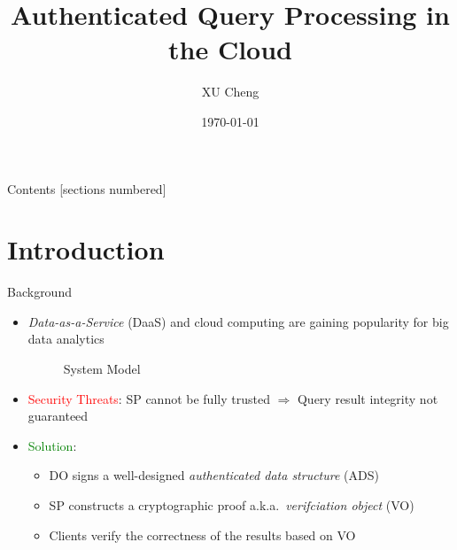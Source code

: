 \documentclass[xcolor={dvipsnames},aspectratio=169,10pt]{beamer}
\title{Authenticated Query Processing in the Cloud}
\author{XU Cheng}
\institute{Supervisor: Prof.~XU Jianliang}
\date{\today}
\begin{document}
\maketitle%

\begin{frame}{Contents}
  [sections numbered]
  \tableofcontents[hideallsubsections]
\end{frame}

\section{Introduction}

\begin{frame}{Background}
  \begin{itemize}[<+->]
    \item \alert{\emph{Data-as-a-Service} (DaaS)} and \alert{cloud computing} are gaining popularity for big data analytics
      \begin{figure}
        
        \caption{System Model}
      \end{figure}
    \item \textcolor{Red}{Security Threats}: SP cannot be fully trusted $\Rightarrow$ Query result integrity not guaranteed
    \item \textcolor{Green}{Solution}:
      \begin{itemize}[<1->]
        \item DO signs a well-designed \alert{\emph{authenticated data structure} (ADS)}
        \item SP constructs a cryptographic proof a.k.a.\ \alert{\emph{verifciation object} (VO)}
        \item Clients verify the correctness of the results based on VO
      \end{itemize}
  \end{itemize}
\end{frame}
\end{document}
